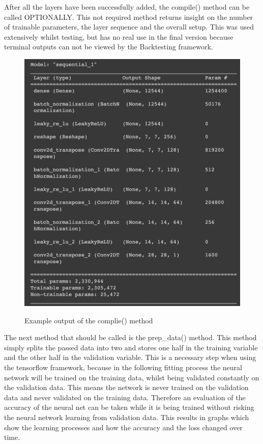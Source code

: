 \documentclass{article}
\begin{document}
After all the layers have been successfully added, the compile() method can be called OPTIONALLY. This not required method returns insight on the number of trainable parameters, the layer sequence and the overall setup. This was used extensively whilst testing, but has no real use in the final version because terminal outputs can not be viewed by the Backtesting framework.\begin{figure}[!h]
    \centering
    \includegraphics[scale=0.3]{NETWORKSTRUCUTRE.png}
    \label{fig:struct}
    \caption{Example output of the complie() method}
\end{figure}
\newline
The next method that should be called is the prep\_data() method. This method simply splits the passed data into two and stores one half in the training variable and the other half in the validation variable. This is a necessary step when using the tensorflow framework, because in the following fitting process the neural network will be trained on the training data, whilst being validated constantly on the validation data. This means the network is never trained on the validation data and never validated on the training data. Therefore an evaluation of the accuracy of the neural net can be taken while it is being trained without risking the neural network learning from validation data. This results in graphs which show the learning processes and how the accuracy and the loss \cite{loss} changed over time.
\end{document}
